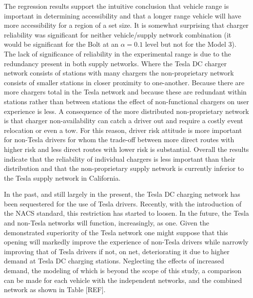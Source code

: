 \documentclass[11pt]{article}
\begin{document}
\begin{multicols}{2}
The regression results support the intuitive conclusion that vehicle range is important in determining accessibility and that a longer range vehicle will have more accessibility for a region of a set size. It is somewhat surprising that charger reliability was significant for neither vehicle/supply network combination (it would be significant for the Bolt at an $\alpha = 0.1$ level but not for the Model 3). The lack of significance of reliability in the experimental range is due to the redundancy present in both supply networks. Where the Tesla DC charger network consists of stations with many chargers the non-proprietary network consists of smaller stations in closer proximity to one-another. Because there are more chargers total in the Tesla network and because these are redundant within stations rather than between stations the effect of non-functional chargers on user experience is less. A consequence of the more distributed non-proprietary network is that charger non-availability can catch a driver out and require a costly event relocation or even a tow. For this reason, driver risk attitude is more important for non-Tesla drivers for whom the trade-off between more direct routes with higher risk and less direct routes with lower risk is substantial. Overall the results indicate that the reliability of individual chargers is less important than their distribution and that the non-proprietary supply network is currently inferior to the Tesla supply network in California.

In the past, and still largely in the present, the Tesla DC charging network has been sequestered for the use of Tesla drivers. Recently, with the introduction of the NACS standard, this restriction has started to loosen. In the future, the Tesla and non-Tesla networks will function, increasingly, as one. Given the demonstrated superiority of the Tesla network one might suppose that this opening will markedly improve the experience of non-Tesla drivers while narrowly improving that of Tesla drivers if not, on net, deteriorating it due to higher demand at Tesla DC charging stations. Neglecting the effects of increased demand, the modeling of which is beyond the scope of this study, a comparison can be made for each vehicle with the independent networks, and the combined network as shown in Table [REF].

 

\newpage

\printbibliography

\end{multicols}
\end{document}

